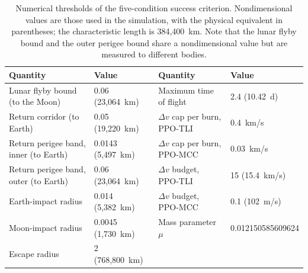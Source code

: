 \begin{table}[H]
\centering
\caption{Numerical thresholds of the five-condition success criterion. Nondimensional values are those used in the simulation, with the physical equivalent in parentheses; the characteristic length is 384,400~km. Note that the lunar flyby bound and the outer perigee bound share a nondimensional value but are measured to different bodies.}
\label{tab:criterion}
\footnotesize
\setlength{\tabcolsep}{4pt}
\begin{tabular}{@{}ll@{\hspace{1.6em}}ll@{}}
\toprule
Quantity & Value & Quantity & Value\\
\midrule
Lunar flyby bound (to the Moon) & 0.06 (23,064~km) & Maximum time of flight & 2.4 (10.42~d)\\
Return corridor (to Earth) & 0.05 (19,220~km) & $\Delta v$ cap per burn, PPO-TLI & 0.4~km/s\\
Return perigee band, inner (to Earth) & 0.0143 (5,497~km) & $\Delta v$ cap per burn, PPO-MCC & 0.03~km/s\\
Return perigee band, outer (to Earth) & 0.06 (23,064~km) & $\Delta v$ budget, PPO-TLI & 15 (15.4~km/s)\\
Earth-impact radius & 0.014 (5,382~km) & $\Delta v$ budget, PPO-MCC & 0.1 (102~m/s)\\
Moon-impact radius & 0.0045 (1,730~km) & Mass parameter $\mu$ & 0.012150585609624\\
Escape radius & 2 (768,800~km) &  & \\
\bottomrule
\end{tabular}
\end{table}
